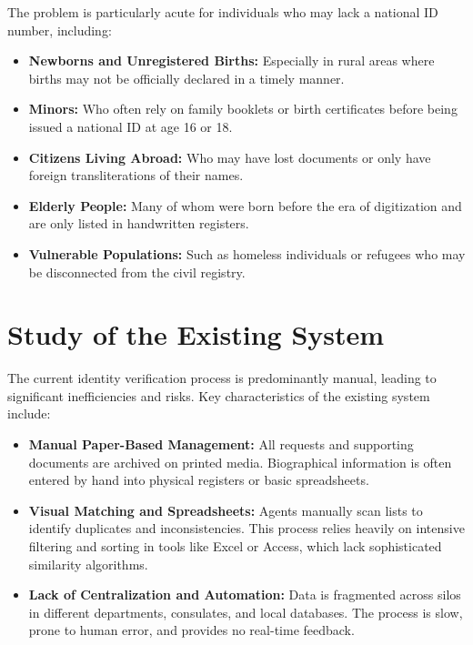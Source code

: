 The problem is particularly acute for individuals who may lack a national ID number, including:
\begin{itemize}
    \item \textbf{Newborns and Unregistered Births:} Especially in rural areas where births may not be officially declared in a timely manner.
    \item \textbf{Minors:} Who often rely on family booklets or birth certificates before being issued a national ID at age 16 or 18.
    \item \textbf{Citizens Living Abroad:} Who may have lost documents or only have foreign transliterations of their names.
    \item \textbf{Elderly People:} Many of whom were born before the era of digitization and are only listed in handwritten registers.
    \item \textbf{Vulnerable Populations:} Such as homeless individuals or refugees who may be disconnected from the civil registry.
\end{itemize}

\section{Study of the Existing System}
The current identity verification process is predominantly manual, leading to significant inefficiencies and risks. Key characteristics of the existing system include:
\begin{itemize}
    \item \textbf{Manual Paper-Based Management:} All requests and supporting documents are archived on printed media. Biographical information is often entered by hand into physical registers or basic spreadsheets.
    \item \textbf{Visual Matching and Spreadsheets:} Agents manually scan lists to identify duplicates and inconsistencies. This process relies heavily on intensive filtering and sorting in tools like Excel or Access, which lack sophisticated similarity algorithms.
    \item \textbf{Lack of Centralization and Automation:} Data is fragmented across silos in different departments, consulates, and local databases. The process is slow, prone to human error, and provides no real-time feedback.
\end{itemize}

